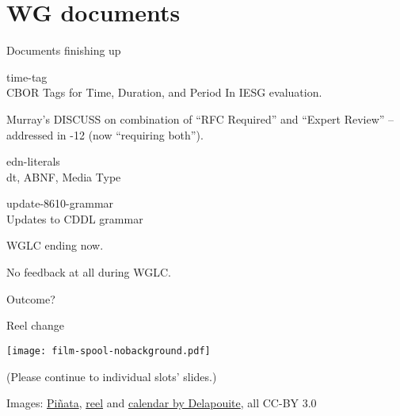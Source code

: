 \documentclass[aspectratio=169]{beamer}
\begin{document}
\section*{WG documents}

\begin{frame}{Documents finishing up}\large

    \begin{block}{\Large time-tag \\ \small CBOR Tags for Time, Duration, and Period}
        In IESG evaluation.

        \medskip

        Murray's DISCUSS on combination of ``RFC Required'' and ``Expert Review''
        -- addressed in -12 (now ``requiring both'').
    \end{block}

    \bigskip

    \begin{block}{edn-literals \\ \scriptsize dt\textquotedbl\textquotedbl, ABNF, Media Type

        \normalsize \mbox{update-8610-grammar} \\ \scriptsize Updates to CDDL grammar
        }
        WGLC ending now.

        \medskip

        No feedback at all during WGLC.

        \medskip

        Outcome?
    \end{block}

\end{frame}

\begin{frame}{Reel change}
    \begin{block}{\texttt{[image: film-spool-nobackground.pdf]}\mbox{\quad}}
        \mbox{}

        \vspace{-1.7cm}

        (Please continue to individual slots' slides.)
    \end{block}

    \vfill
    \tiny Images:
    \href{https://game-icons.net/1x1/delapouite/pinata.html}{Piñata},
    \href{https://game-icons.net/1x1/delapouite/film-spool.html}{reel} and
    \href{https://game-icons.net/1x1/delapouite/calendar.html}{calendar by Delapouite}, all CC-BY 3.0
\end{frame}
\end{document}
